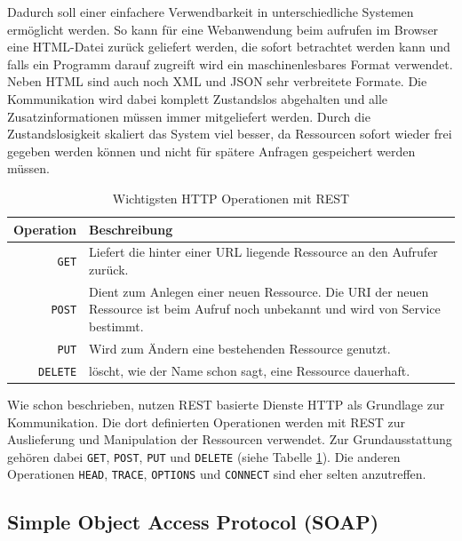 Dadurch soll einer einfachere Verwendbarkeit in unterschiedliche Systemen ermöglicht werden. So kann für eine Webanwendung beim aufrufen im Browser eine HTML-Datei zurück geliefert werden, die sofort betrachtet werden kann und falls ein Programm darauf zugreift wird ein maschinenlesbares Format verwendet. Neben HTML sind auch noch XML und JSON sehr verbreitete Formate. Die Kommunikation wird dabei komplett Zustandslos abgehalten und alle Zusatzinformationen müssen immer mitgeliefert werden. Durch die Zustandslosigkeit skaliert das System viel besser, da Ressourcen sofort wieder frei gegeben werden können und nicht für spätere Anfragen gespeichert werden müssen. 

\begin{table}[ht]
\centering
\caption{Wichtigsten HTTP Operationen mit REST} 
\begin{tabular}{r|p{12cm}}
    \textbf{Operation} & 
    \textbf{Beschreibung} \\ 
    \hline
    \texttt{GET} & 
    Liefert die hinter einer URL liegende Ressource an den Aufrufer zurück.\\
    
    \texttt{POST} & 
    Dient zum Anlegen einer neuen Ressource. Die URI der neuen Ressource ist beim Aufruf noch unbekannt und wird von Service bestimmt. \\

    \texttt{PUT} & 
    Wird zum Ändern eine bestehenden Ressource genutzt. \\
    
    \texttt{DELETE} &
    löscht, wie der Name schon sagt, eine Ressource dauerhaft.
\end{tabular}
\label{tbl:rest_oprations}
\end{table} 

Wie schon beschrieben, nutzen REST basierte Dienste HTTP als Grundlage zur Kommunikation. Die dort definierten Operationen werden mit REST zur Auslieferung und Manipulation der Ressourcen verwendet. Zur Grundausstattung  gehören dabei \texttt{GET}, \texttt{POST}, \texttt{PUT} und \texttt{DELETE} (siehe Tabelle \ref{tbl:rest_oprations}). Die anderen Operationen \texttt{HEAD}, \texttt{TRACE}, \texttt{OPTIONS} und \texttt{CONNECT} sind eher selten anzutreffen.
     

\subsection{Simple Object Access Protocol (SOAP)} %
\label{sub:soap}

